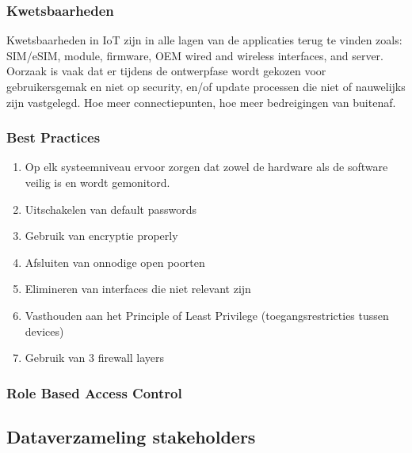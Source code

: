\subsubsection{Kwetsbaarheden}
Kwetsbaarheden in IoT zijn in alle lagen van de applicaties  terug te vinden zoals: SIM/eSIM, module, firmware, OEM wired and wireless interfaces, and server. Oorzaak is vaak dat er tijdens de ontwerpfase wordt gekozen voor gebruikersgemak en niet op security, en/of update processen die niet of nauwelijks zijn vastgelegd.
Hoe meer connectiepunten, hoe meer bedreigingen van buitenaf.

\subsubsection{Best Practices}

\begin{enumerate}
	\item  Op elk systeemniveau ervoor zorgen dat zowel de hardware als de software veilig is en wordt gemonitord. 
	
	\item Uitschakelen van default passwords
	\item Gebruik van encryptie properly
	\item Afsluiten van onnodige open poorten
	
	\item Elimineren van interfaces die niet relevant zijn
	\item Vasthouden aan het Principle of Least Privilege (toegangsrestricties tussen devices)
	\item Gebruik van 3 firewall layers
	
\end{enumerate}
\subsubsection{Role Based Access Control}




\subsection{Dataverzameling stakeholders}

